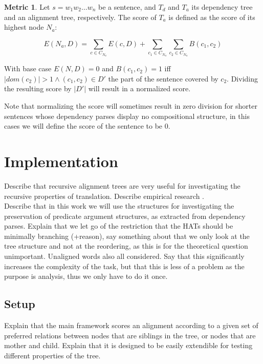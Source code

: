 \documentclass{report}
\theoremstyle{definition}
\newtheorem{metric}{Metric}
\theoremstyle{plain}
\begin{document}
\begin{metric}\label{m2}
Let $s = w_1 w_2 \dots w_n$ be a sentence, and $T_d$ and $T_a$ its dependency tree and an alignment tree, respectively. The score of $T_a$ is defined as the score of its highest node $N_{a}$:

$$
E(N_a,D) = \sum_{c\in C_{N_a}} E(c,D)+ \sum_{c_1\in C_{N_a}} \sum_{c_2\in C_{N_a}} B(c_1,c_2)
$$

\noindent With base case $E(N,D) = 0$ and $B(c_1,c_2) = 1$ iff  $|dom(c_2)| > 1 \land (c_1,c_2)\in D'$ the part of the sentence covered by $c_2$. Dividing the resulting score by $|D'|$ will result in a normalized score.
\end{metric}

Note that normalizing the score will sometimes result in zero division for shorter sentences whose dependency parses display no compositional structure, in this cases we will define the score of the sentence to be 0.


\chapter{Implementation}
\label{chapter:impl}
Describe that recursive alignment trees are very useful for investigating the recursive properties of translation. Describe empirical research \cite{simaan2013hats}.\\
Describe that in this work we will use the structures for investigating the preservation of predicate argument structures, as extracted from dependency parses. Explain that we let go of the restriction that the HATs should be minimally branching (+reason), say something about that we only look at the tree structure and not at the reordering, as this is for the theoretical question unimportant.
Unaligned words also all considered. Say that this significantly increases the complexity of the task, but that this is less of a problem as the purpose is analysis, thus we only have to do it once.



\section{Setup}

Explain that the main framework scores an alignment according to a given set of preferred relations between nodes that are siblings in the tree, or nodes that are mother and child. Explain that it is designed to be easily extendible for testing different properties of the tree.
\end{document}
